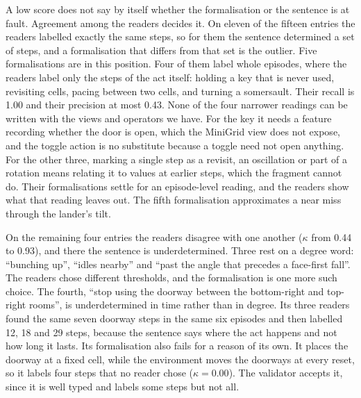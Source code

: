 \documentclass{article}
\begin{document}
A low score does not say by itself whether the formalisation or the
sentence is at fault. Agreement among the readers decides it. On eleven
of the fifteen entries the readers labelled exactly the same steps, so for
them the sentence determined a set of steps, and a formalisation that
differs from that set is the outlier. Five formalisations are in this
position. Four of them label whole episodes, where the readers label
only the steps of the act itself: holding a key that is never used,
revisiting cells, pacing between two cells, and turning a somersault.
Their recall is 1.00 and their precision at most 0.43. None of the four
narrower readings can be written with the views and operators we have.
For the key it needs a feature recording whether the door is open, which
the MiniGrid view does not expose, and the toggle action is no substitute
because a toggle need not open anything. For the other three, marking a single step as a
revisit, an oscillation or part of a rotation means relating it to values
at earlier steps, which the fragment cannot do. Their formalisations settle for an episode-level reading, and the
readers show what that reading leaves out. The fifth formalisation
approximates a near miss through the lander's tilt.

On the remaining four entries the readers disagree with one another
($\kappa$ from 0.44 to 0.93), and there the sentence is underdetermined.
Three rest on a degree word: ``bunching up'', ``idles nearby'' and ``past
the angle that precedes a face-first fall''. The readers chose
different thresholds, and the formalisation is one more such choice. The
fourth, ``stop using the doorway between the bottom-right and top-right
rooms'', is underdetermined in time rather than in degree. Its three
readers found the same seven doorway steps in the same six episodes and
then labelled 12, 18 and 29 steps, because the sentence says where the act
happens and not how long it lasts. Its formalisation also fails for a
reason of its own. It places the doorway at a fixed cell, while the
environment moves the doorways at every reset, so it labels four steps
that no reader chose ($\kappa=0.00$). The validator accepts it, since it
is well typed and labels some steps but not all.
\end{document}

